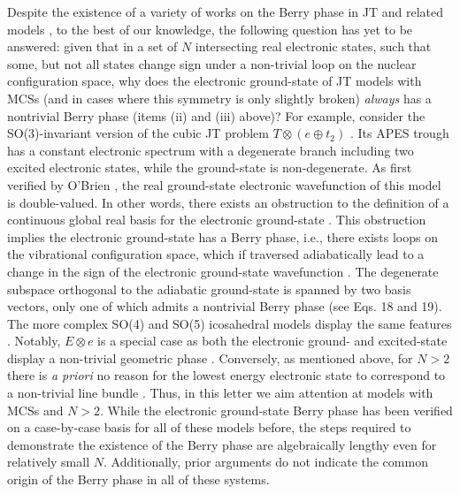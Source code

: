 \documentclass[superscriptaddress,showpacs,amsmath,amssymb,pra,twocolumn]{revtex4-1}
\begin{document}
Despite the existence of a variety of works on the Berry phase in JT and related models \cite{zwanziger_topological_1987, chancey1997jahn, ham_berrys_1987, de_los_rios_dynamical_1996, chancey_berrys_1988,ceulemans_berry_1991, apsel_berry_1992,cullerne_jahn-teller_1994,auerbach_vibrations_1994,schon_geometric_1995, manini_roberry_1998,bohm2003geometric,varandas_geometric_2004,lijnen_berry_2005,garcia-fernandez_lost_2006,bersuker_jahn-teller_2006, althorpe_effect_2008, zygelman_molecular_2017, abedi_correlated_2012, ryabinkin_geometric_2013, englman_spectroscopic_2016, requist_molecular_2016-1},
to the best of our knowledge, the following question has yet to be
answered: given that in a set of $N$ intersecting real electronic states,
such that some, but not all states change sign under a non-trivial
loop on the nuclear configuration space, why does the electronic ground-state
of JT models with MCSs (and in cases where this symmetry is only slightly
broken) \textit{always} has a nontrivial Berry phase (items (ii) and (iii) above)?
For example, consider the SO(3)-invariant version of the cubic JT
problem $T\otimes(e\oplus t_{2})$ \cite{obrien_dynamic_1969-2}.
Its APES trough has a constant electronic spectrum with a degenerate
branch including two excited electronic states, while the ground-state
is non-degenerate. As first verified by O'Brien \cite{obrien_dynamic_1969-2},
the real ground-state electronic wavefunction of this model is double-valued.
In other words, there exists an obstruction to the definition of a
continuous global real basis for the electronic ground-state \cite{chancey_berrys_1988,ceulemans_berry_1991}.
This obstruction implies the electronic ground-state has a Berry phase,
i.e., there exists loops on the vibrational configuration space,
which if traversed adiabatically lead to a change in the sign of
the electronic ground-state wavefunction \cite{longuet-higgins_intersection_1975,bohm2003geometric}.
The degenerate subspace orthogonal to the adiabatic ground-state is
spanned by two basis vectors, only one of which admits a nontrivial
Berry phase (see Eqs. 18 and 19). The more complex SO(4) and SO(5)
icosahedral models display the same features \cite{cullerne_jahn-teller_1994,de_los_rios_dynamical_1996,chancey1997jahn}. Notably, $E \otimes e$ is a special case as both the electronic ground- and excited-state display a non-trivial geometric phase \cite{bersuker_jahn-teller_2006}. Conversely, as mentioned above, for $N > 2$ there is \textit{a priori} no reason for the lowest energy electronic state to correspond to a non-trivial line bundle \cite{varandas_geometric_2004,varandas_geometrical_2010}. Thus, in this letter we aim attention at models with MCSs and $N > 2$. While the electronic ground-state Berry phase has been verified on a case-by-case basis for all of these models before, the steps required to demonstrate the existence of the Berry phase are algebraically lengthy even for relatively small $N$\cite{chancey1997jahn}. Additionally, prior arguments do not indicate the common origin of the Berry phase in all of these systems.
\end{document}
